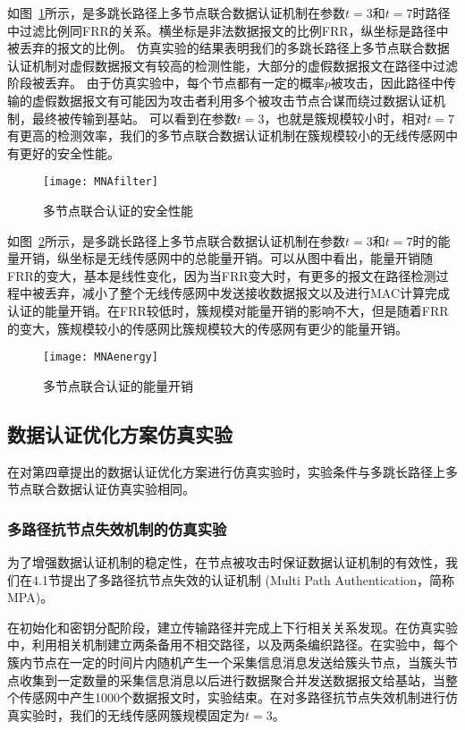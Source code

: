 如图~\ref{fig:MNAfilter}所示，是多跳长路径上多节点联合数据认证机制在参数$t=3$和$t=7$时路径中过滤比例同FRR的关系。横坐标是非法数据报文的比例FRR，纵坐标是路径中被丢弃的报文的比例。
仿真实验的结果表明我们的多跳长路径上多节点联合数据认证机制对虚假数据报文有较高的检测性能，大部分的虚假数据报文在路径中过滤阶段被丢弃。
由于仿真实验中，每个节点都有一定的概率$p$被攻击，因此路径中传输的虚假数据报文有可能因为攻击者利用多个被攻击节点合谋而绕过数据认证机制，最终被传输到基站。
可以看到在参数$t=3$，也就是簇规模较小时，相对$t=7$有更高的检测效率，我们的多节点联合数据认证机制在簇规模较小的无线传感网中有更好的安全性能。
\begin{figure}[htbp]
  \centering
  \texttt{[image: MNAfilter]}
  \caption{多节点联合认证的安全性能}
  \label{fig:MNAfilter}
\end{figure}

如图~\ref{fig:MNAenergy}所示，是多跳长路径上多节点联合数据认证机制在参数$t=3$和$t=7$时的能量开销，纵坐标是无线传感网中的总能量开销。可以从图中看出，能量开销随FRR的变大，基本是线性变化，因为当FRR变大时，有更多的报文在路径检测过程中被丢弃，减小了整个无线传感网中发送接收数据报文以及进行MAC计算完成认证的能量开销。在FRR较低时，簇规模对能量开销的影响不大，但是随着FRR的变大，簇规模较小的传感网比簇规模较大的传感网有更少的能量开销。

\begin{figure}[htbp]
  \centering
  \texttt{[image: MNAenergy]}
  \caption{多节点联合认证的能量开销}
  \label{fig:MNAenergy}
\end{figure}

\subsection{数据认证优化方案仿真实验}
在对第四章提出的数据认证优化方案进行仿真实验时，实验条件与多跳长路径上多节点联合数据认证仿真实验相同。
\subsubsection{多路径抗节点失效机制的仿真实验}
为了增强数据认证机制的稳定性，在节点被攻击时保证数据认证机制的有效性，我们在4.1节提出了多路径抗节点失效的认证机制
(Multi Path Authentication，简称MPA)。

在初始化和密钥分配阶段，建立传输路径并完成上下行相关关系发现。在仿真实验中，利用相关机制建立两条备用不相交路径，以及两条编织路径。在实验中，每个簇内节点在一定的时间片内随机产生一个采集信息消息发送给簇头节点，当簇头节点收集到一定数量的采集信息消息以后进行数据聚合并发送数据报文给基站，当整个传感网中产生1000个数据报文时，实验结束。在对多路径抗节点失效机制进行仿真实验时，我们的无线传感网簇规模固定为$t=3$。

